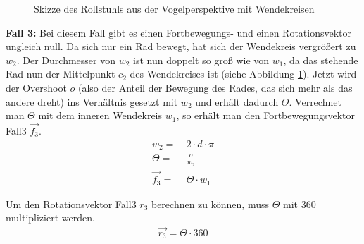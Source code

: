 \begin{figure}[h]
    \centering
    \caption{Skizze des Rollstuhls aus der Vogelperspektive mit Wendekreisen}
    \label{fig:wendekreis}
\end{figure}

\textbf{Fall 3:}
Bei diesem Fall gibt es einen Fortbewegungs- und einen Rotationsvektor ungleich null.
Da sich nur ein Rad bewegt, hat sich der Wendekreis vergrößert zu $w_2$.
Der Durchmesser von $w_2$ ist nun doppelt so groß wie von $w_1$, da das stehende Rad nun der Mittelpunkt $c_2$ des Wendekreises ist (siehe Abbildung \ref{fig:wendekreis}).
Jetzt wird der Overshoot $o$ (also der Anteil der Bewegung des Rades, das sich mehr als das andere dreht) ins Verhältnis gesetzt mit $w_2$ und erhält dadurch $\Theta$.
Verrechnet man $\Theta$ mit dem inneren Wendekreis $w_1$, so erhält man den Fortbewegungsvektor Fall3 $\vec{f_3}$.
\begin{align}
    w_2 =       & \ 2 \cdot d \cdot \pi \\
    \Theta =    & \ \frac {o} {w_2}     \\
    \vec{f_3} = & \ \Theta \cdot w_1
\end{align}

Um den Rotationsvektor Fall3 $r_3$ berechnen zu können, muss $\Theta$ mit $360$ multipliziert werden.
\begin{align}
    \vec{r_3} = \Theta \cdot 360
\end{align}

